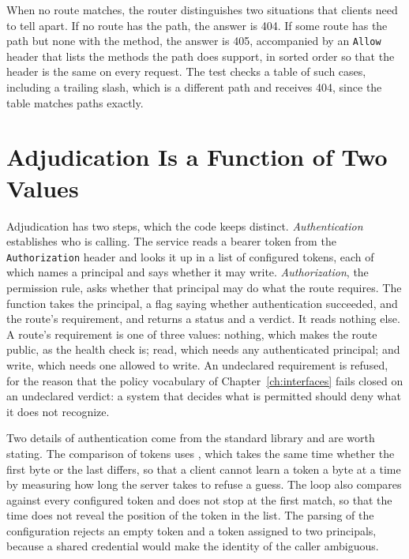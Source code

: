 When no route matches, the router distinguishes two situations that clients need to tell apart. If no route has the path, the answer is 404. If some route has the path but none with the method, the answer is 405, accompanied by an \texttt{Allow} header that lists the methods the path does support, in sorted order so that the header is the same on every request. The test  checks a table of such cases, including a trailing slash, which is a different path and receives 404, since the table matches paths exactly.

\section{Adjudication Is a Function of Two Values}


Adjudication has two steps, which the code keeps distinct. \emph{Authentication} establishes who is calling. The service reads a bearer token from the \texttt{Authorization} header and looks it up in a list of configured tokens, each of which names a principal and says whether it may write. \emph{Authorization}, the permission rule, asks whether that principal may do what the route requires. The function  takes the principal, a flag saying whether authentication succeeded, and the route's requirement, and returns a status and a verdict. It reads nothing else. A route's requirement is one of three values: nothing, which makes the route public, as the health check is; read, which needs any authenticated principal; and write, which needs one allowed to write. An undeclared requirement is refused, for the reason that the policy vocabulary of Chapter~\ref{ch:interfaces} fails closed on an undeclared verdict: a system that decides what is permitted should deny what it does not recognize.

Two details of authentication come from the standard library and are worth stating. The comparison of tokens uses , which takes the same time whether the first byte or the last differs, so that a client cannot learn a token a byte at a time by measuring how long the server takes to refuse a guess. The loop also compares against every configured token and does not stop at the first match, so that the time does not reveal the position of the token in the list. The parsing of the configuration rejects an empty token and a token assigned to two principals, because a shared credential would make the identity of the caller ambiguous.


